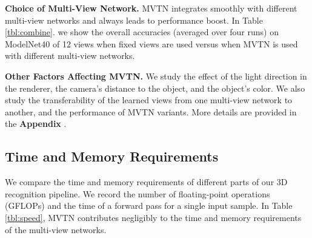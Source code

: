 \documentclass[10pt,twocolumn,letterpaper]{article}
\newcommand{\mysection}[1]{\noindent\textbf{#1.}}
\newcommand{\supp}{\textbf{Appendix\xspace} }
\begin{document}
\mysection{Choice of Multi-View Network}
MVTN integrates smoothly with different multi-view networks and always leads to performance boost. In Table \ref{tbl:combine}. we show the overall accuracies (averaged over four runs) on ModelNet40 of 12 views when fixed views are used versus when MVTN is used with different multi-view networks.

\begin{table}[t]

\tabcolsep=0.11cm
\centering
{}
\vspace{2pt}
\caption{\small \textbf{Integrating MVTN with Multi-View Networks}.
We show overall classification accuracies on ModelNet40 with 12 views on different multi-view networks when fixed views are used versus when MVTN is used. 
}
\label{tbl:combine}
\end{table}

\mysection{Other Factors Affecting MVTN} 
We study the effect of the light direction in the renderer, the camera's distance to the object, and the object's color.
We also study the transferability of the learned views from one multi-view network to another, and the performance of MVTN variants. More details are provided in the \supp\hspace{-2pt}.






\subsection{Time and Memory Requirements}
\vspace{-4pt}
We compare the time and memory requirements of different parts of our 3D recognition pipeline. We record the number of floating-point operations (GFLOPs) and the time of a forward pass for a single input sample. In Table \ref{tbl:speed}, MVTN contributes negligibly to the time and memory requirements of the multi-view networks. 
\end{document}
